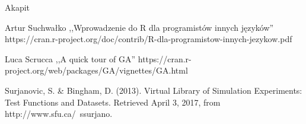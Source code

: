 \documentclass[11pt, a4paper]{article}
\newcommand{\fbi}{\leavevmode{\parindent=1em\indent}}
\begin{document}
\fbi
Akapit

\newpage
\begin{thebibliography}{40}

Artur Suchwałko ,,Wprowadzenie do R dla programistów innych języków'' https://cran.r-project.org/doc/contrib/R-dla-programistow-innych-jezykow.pdf

Luca Scrucca ,,A quick tour of GA''
https://cran.r-project.org/web/packages/GA/vignettes/GA.html

Surjanovic, S. \& Bingham, D. (2013). Virtual Library of Simulation Experiments: Test Functions and Datasets. Retrieved April 3, 2017, from http://www.sfu.ca/~ssurjano.

\end{thebibliography}
\end{document}
